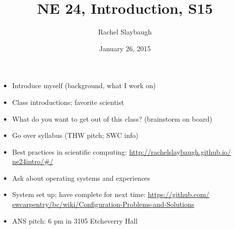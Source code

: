 \documentclass[12pt]{article}
\title{NE 24, Introduction, S15}
\author{Rachel Slaybaugh}
\date{January 26, 2015}
\begin{document}
\maketitle

\begin{itemize}
\item Introduce myself (background, what I work on)

\item Class introductions; favorite scientist

\item What do you want to get out of this class? (brainstorm on board)

\item Go over syllabus (THW pitch; SWC info)

\item Best practices in scientific computing: \href{http://rachelslaybaugh.github.io/ne24intro/\#/}{http://rachelslaybaugh.github.io/\\ne24intro/\#/}

\item Ask about operating systems and experiences

\item System set up; have complete for next time:  \href{https://github.com/swcarpentry/bc/wiki/Configuration-Problems-and-Solutions}{https://github.com/\\swcarpentry/bc/wiki/Configuration-Problems-and-Solutions}

\item ANS pitch: 6 pm in 3105 Etcheverry Hall

\end{itemize}
\end{document}
